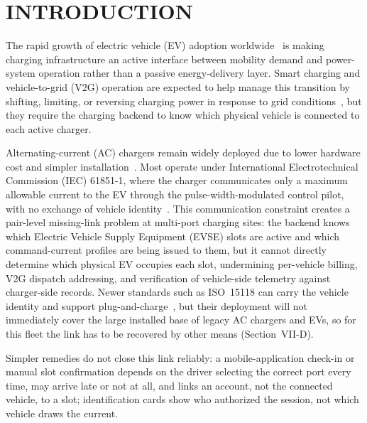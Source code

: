 \documentclass{ieeeaccess}
\newif\ifhighlight \highlightfalse
\DeclareRobustCommand{\revised}[1]{\ifhighlight{\color{blue}#1}\else{\color{.}#1}\fi}
\begin{document}
    \section{INTRODUCTION}

    The rapid growth of electric vehicle (EV) adoption worldwide~\cite{biea26} is making charging infrastructure an active interface between mobility demand and power-system operation rather than a passive energy-delivery layer.
    Smart charging and vehicle-to-grid (V2G) operation are expected to help manage this transition by shifting, limiting, or reversing charging power in response to grid conditions~\cite{b2,b3,b5}, but they require the charging backend to know which physical vehicle is connected to each active charger.

    Alternating-current (AC) chargers remain widely deployed due to lower hardware cost and simpler installation~\cite{b8}.
    Most operate under International Electrotechnical Commission (IEC) 61851-1, where the charger communicates only a maximum allowable current to the EV through the pulse-width-modulated control pilot, with no exchange of vehicle identity~\cite{biec,b6}.
    This communication constraint creates a pair-level missing-link problem at multi-port charging sites: the backend knows which Electric Vehicle Supply Equipment (EVSE) slots are active and which command-current profiles are being issued to them, but it cannot directly determine which physical EV occupies each slot, undermining per-vehicle billing, V2G dispatch addressing, and verification of vehicle-side telemetry against charger-side records.
    \revised{Newer standards such as ISO~15118 can carry the vehicle identity and support plug-and-charge~\cite{b7}, but their deployment will not immediately cover the large installed base of legacy AC chargers and EVs, so for this fleet the link has to be recovered by other means (Section~VII-D).}

    \revised{Simpler remedies do not close this link reliably: a mobile-application check-in or manual slot confirmation depends on the driver selecting the correct port every time, may arrive late or not at all, and links an account, not the connected vehicle, to a slot; identification cards show who authorized the session, not which vehicle draws the current.}
\end{document}
